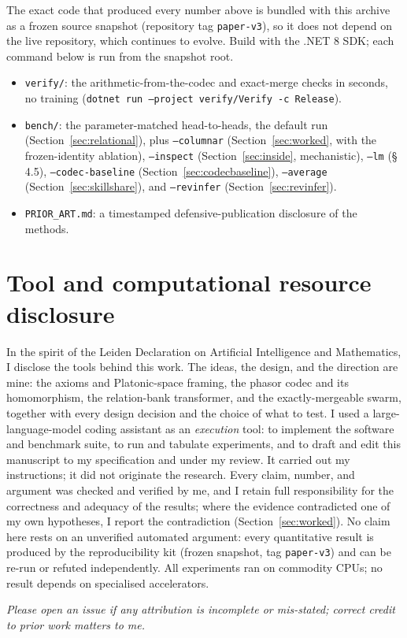 \documentclass[11pt]{article}
\newcommand{\code}[1]{\texttt{#1}}
\begin{document}
The exact code that produced every number above is bundled with this archive as a frozen source
snapshot (repository tag \texttt{paper-v3}), so it does not depend on the live repository, which
continues to evolve. Build with the .NET 8 SDK; each command below is run from the snapshot root.

\begin{itemize}
\item \code{verify/}: the arithmetic-from-the-codec and exact-merge checks in seconds, no training
(\code{dotnet run --project verify/Verify -c Release}).
\item \code{bench/}: the parameter-matched head-to-heads, the default run (Section~\ref{sec:relational}),
plus \code{--columnar} (Section~\ref{sec:worked}, with the frozen-identity ablation), \code{--inspect}
(Section~\ref{sec:inside}, mechanistic), \code{--lm} (\S\,4.5), \code{--codec-baseline}
(Section~\ref{sec:codecbaseline}), \code{--average} (Section~\ref{sec:skillshare}), and \code{--revinfer}
(Section~\ref{sec:revinfer}).
\item \code{PRIOR\_ART.md}: a timestamped defensive-publication disclosure of the methods.
\end{itemize}

\section*{Tool and computational resource disclosure}

In the spirit of the Leiden Declaration on Artificial Intelligence and Mathematics, I disclose the tools
behind this work. The ideas, the design, and the direction are mine: the axioms and Platonic-space
framing, the phasor codec and its homomorphism, the relation-bank transformer, and the exactly-mergeable
swarm, together with every design decision and the choice of what to test. I used a large-language-model
coding assistant as an \emph{execution} tool: to implement the software and benchmark suite, to run and
tabulate experiments, and to draft and edit this manuscript to my specification and under my review. It
carried out my instructions; it did not originate the research. Every claim, number, and argument was
checked and verified by me, and I retain full responsibility for the correctness and adequacy of the
results; where the evidence contradicted one of my own hypotheses, I report the contradiction
(Section~\ref{sec:worked}). No claim here rests on an unverified automated argument: every quantitative
result is produced by the reproducibility kit (frozen snapshot, tag \texttt{paper-v3}) and can be re-run
or refuted independently. All experiments ran on commodity CPUs; no result depends on specialised
accelerators.

\printbibliography[title={References}]

\vspace{1em}
\emph{Please open an issue if any attribution is incomplete or mis-stated; correct credit to prior work
matters to me.}
\end{document}
